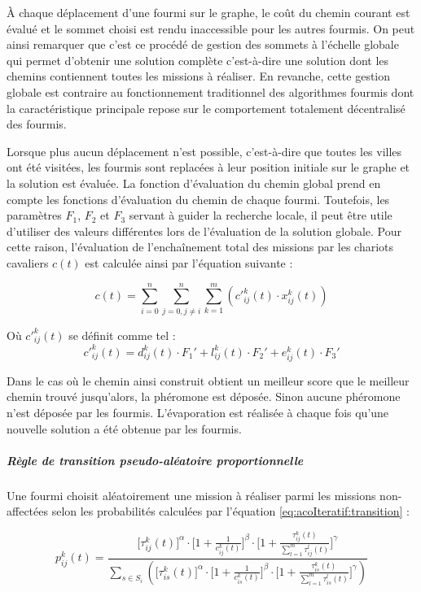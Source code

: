 À chaque déplacement d'une fourmi sur le graphe, le coût du chemin courant est évalué et le sommet choisi est rendu inaccessible pour les autres fourmis. On peut ainsi remarquer que c'est ce procédé de gestion des sommets à l'échelle globale qui permet d'obtenir une solution complète c'est-à-dire une solution dont les chemins contiennent toutes les missions à réaliser. En revanche, cette gestion globale est contraire au fonctionnement traditionnel des algorithmes fourmis dont la caractéristique principale repose sur le comportement totalement décentralisé des fourmis.

Lorsque plus aucun déplacement n'est possible, c'est-à-dire que toutes les villes ont été visitées, les fourmis sont replacées à leur position initiale sur le graphe et la solution est évaluée. La fonction d'évaluation du chemin global prend en compte les fonctions d'évaluation du chemin de chaque fourmi. Toutefois, les paramètres $F_1$, $F_2$ et $F_3$ servant à guider la recherche locale, il peut être utile d'utiliser des valeurs différentes lors de l'évaluation de la solution globale. Pour cette raison, l'évaluation de l'enchaînement total des missions par les chariots cavaliers $c(t)$ est calculée ainsi par l'équation suivante : 

\begin{equation}
 c(t) = \sum \limits_{i=0}^n \sum \limits_{j=0, j\neq i}^n \sum \limits_{k=1}^m \left(c'^k_{ij}(t) \cdot x^k_{ij}(t)\right) 
\end{equation}

Où $c'^k_{ij}(t)$ se définit comme tel :
\begin{equation}
 c'^k_{ij}(t) = d^k_{ij}(t) \cdot F_1' + l^k_{ij}(t) \cdot F_2' + e^k_{ij}(t) \cdot F_3'
\end{equation}

Dans le cas où le chemin ainsi construit obtient un meilleur score que le meilleur chemin trouvé jusqu'alors, la phéromone est déposée. Sinon aucune phéromone n'est déposée par les fourmis. L'évaporation est réalisée à chaque fois qu'une nouvelle solution a été obtenue par les fourmis.

\subparagraph{Règle de transition pseudo-aléatoire proportionnelle\\}

Une fourmi choisit aléatoirement une mission à réaliser parmi les missions non-affectées selon les probabilités calculées par l'équation \ref{eq:acoIteratif:transition} : 

\begin{equation} \label{eq:acoIteratif:transition}
 p^k_{ij}(t) = \frac{\bigg[\tau^k_{ij}(t)\bigg]^\alpha \cdot \bigg[1 + \frac{1}{c^k_{ij}(t)}\bigg]^\beta \cdot \bigg[1 + \frac{\tau^k_{ij}(t)}{\sum \limits_{l=1}^{m} \tau^l_{ij}(t)}\bigg]^\gamma}
 {\sum \limits_{s \in S_i} \left(\bigg[\tau^k_{is}(t)\bigg]^\alpha \cdot \bigg[1 + \frac{1}{c^k_{is}(t)}\bigg]^\beta \cdot \bigg[1 + \frac{\tau^k_{is}(t)}{\sum \limits_{l=1}^{m} \tau^l_{is}(t)}\bigg]^\gamma\right)}
\end{equation}

